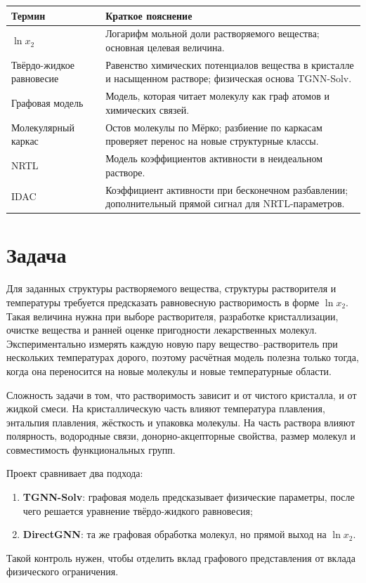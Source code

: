 \documentclass[11pt]{article}
\begin{document}
\begin{center}
\begin{tabularx}{\textwidth}{P{0.24\textwidth}Y}
\toprule
Термин & Краткое пояснение \\
\midrule
$\ln x_2$ & Логарифм мольной доли растворяемого вещества; основная целевая величина. \\
Твёрдо-жидкое равновесие & Равенство химических потенциалов вещества в кристалле и насыщенном растворе; физическая основа TGNN-Solv. \\
Графовая модель & Модель, которая читает молекулу как граф атомов и химических связей. \\
Молекулярный каркас & Остов молекулы по Мёрко; разбиение по каркасам проверяет перенос на новые структурные классы. \\
NRTL & Модель коэффициентов активности в неидеальном растворе. \\
IDAC & Коэффициент активности при бесконечном разбавлении; дополнительный прямой сигнал для NRTL-параметров. \\
\bottomrule
\end{tabularx}
\end{center}

\section{Задача}

Для заданных структуры растворяемого вещества, структуры растворителя и температуры требуется предсказать равновесную растворимость в форме $\ln x_2$. Такая величина нужна при выборе растворителя, разработке кристаллизации, очистке вещества и ранней оценке пригодности лекарственных молекул. Экспериментально измерять каждую новую пару вещество--растворитель при нескольких температурах дорого, поэтому расчётная модель полезна только тогда, когда она переносится на новые молекулы и новые температурные области.

Сложность задачи в том, что растворимость зависит и от чистого кристалла, и от жидкой смеси. На кристаллическую часть влияют температура плавления, энтальпия плавления, жёсткость и упаковка молекулы. На часть раствора влияют полярность, водородные связи, донорно-акцепторные свойства, размер молекул и совместимость функциональных групп.

Проект сравнивает два подхода:
\begin{enumerate}
    \item \textbf{TGNN-Solv}: графовая модель предсказывает физические параметры, после чего решается уравнение твёрдо-жидкого равновесия;
    \item \textbf{DirectGNN}: та же графовая обработка молекул, но прямой выход на $\ln x_2$.
\end{enumerate}
Такой контроль нужен, чтобы отделить вклад графового представления от вклада физического ограничения.
\end{document}
